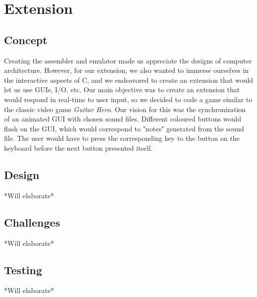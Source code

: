 \documentclass[11pt]{article}
\begin{document}
\section{Extension}

\subsection{Concept}

Creating the assembler and emulator made us appreciate the designs of computer architecture. However, for our extension, we also wanted to immerse ourselves in the interactive aspects of C, and we endeavored to create an extension that would let us use GUIs, I/O, etc. Our main objective was to create an extension that would respond in real-time to user input, so we decided to code a game similar to the classic video game \emph{Guitar Hero}. Our vision for this was the synchronization of an animated GUI with chosen sound files. Different coloured buttons would flash on the GUI, which would correspond to "notes" generated from the sound file. The user would have to press the corresponding key to the button on the keyboard before the next button presented itself.

\subsection{Design}

*Will elaborate*

\subsection{Challenges}

*Will elaborate*

\subsection{Testing}

*Will elaborate*
\end{document}
